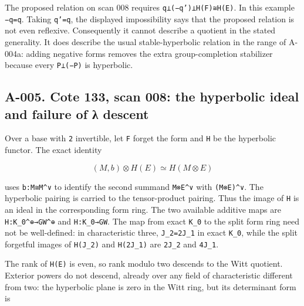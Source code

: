 \documentclass[
  10pt,
]{article}
\begin{document}
The proposed relation on scan 008 requires
\texttt{\small q⊥(\allowbreak{}−q')\allowbreak{}⊥H(\allowbreak{}F)\allowbreak{}≅H(\allowbreak{}E)\allowbreak{}}.
In this example \texttt{\small −q=\allowbreak{}q}. Taking
\texttt{\small q'=\allowbreak{}q}, the displayed impossibility says that
the proposed relation is not even reflexive. Consequently it cannot
describe a quotient in the stated generality. It does describe the usual
stable-hyperbolic relation in the range of A-004a: adding negative forms
removes the extra group-completion stabilizer because every
\texttt{\small P⊥(\allowbreak{}−P)\allowbreak{}} is hyperbolic.

\subsection{A-005. Cote 133, scan 008: the hyperbolic ideal and failure
of λ
descent}\label{a-005.-cote-133-scan-008-the-hyperbolic-ideal-and-failure-of-ux3bb-descent}

Over a base with \texttt{\small 2} invertible, let \texttt{\small F}
forget the form and \texttt{\small H} be the hyperbolic functor. The
exact identity

\[
(M,b)\otimes H(E)\simeq H(M\otimes E)
\tag{A5.1}
\]

uses \texttt{\small b:\allowbreak{}M≅M\textasciicircum{}∨} to identify
the second summand \texttt{\small M⊗\allowbreak{}E\textasciicircum{}∨}
with
\texttt{\small (\allowbreak{}M⊗\allowbreak{}E)\allowbreak{}\textasciicircum{}∨}.
The hyperbolic pairing is carried to the tensor-product pairing. Thus
the image of \texttt{\small H} is an ideal in the corresponding form
ring. The two available additive maps are
\texttt{\small H:\allowbreak{}K\_\allowbreak{}0\textasciicircum{}⊕\allowbreak{}→\allowbreak{}GW\textasciicircum{}⊕\allowbreak{}}
and \texttt{\small H:\allowbreak{}K\_\allowbreak{}0→\allowbreak{}GW}.
The map from exact \texttt{\small K\_\allowbreak{}0} to the split form
ring need not be well-defined: in characteristic three,
\texttt{\small J\_\allowbreak{}2=\allowbreak{}2J\_\allowbreak{}1} in
exact \texttt{\small K\_\allowbreak{}0}, while the split forgetful
images of \texttt{\small H(\allowbreak{}J\_\allowbreak{}2)\allowbreak{}}
and \texttt{\small H(\allowbreak{}2J\_\allowbreak{}1)\allowbreak{}} are
\texttt{\small 2J\_\allowbreak{}2} and
\texttt{\small 4J\_\allowbreak{}1}.

The rank of \texttt{\small H(\allowbreak{}E)\allowbreak{}} is even, so
rank modulo two descends to the Witt quotient. Exterior powers do not
descend, already over any field of characteristic different from two:
the hyperbolic plane is zero in the Witt ring, but its determinant form
is
\end{document}
